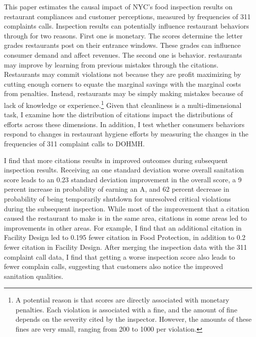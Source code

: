 \documentclass[10pt]{article} %
\begin{document}
This paper estimates the causal impact of NYC's food inspection results on restaurant compliances and customer perceptions, measured by frequencies of 311 complaints calls. Inspection results can potentially influence restaurant behaviors through for two reasons. First one is monetary. The scores determine the letter grades restaurants post on their entrance windows. These grades can influence consumer demand and affect revenues. The second one is behavior. restaurants may improve by learning from previous mistakes through the citations. Restaurants may commit violations not because they are profit maximizing by cutting enough corners to equate the marginal savings with the marginal costs from penalties. Instead, restaurants may be simply making mistakes because of lack of knowledge or experience.\footnote{A potential reason is that scores are directly associated with monetary penalties. Each violation is associated with a fine, and the amount of fine depends on the severity cited by the inspector. However, the amounts of these fines are very small, ranging from 200 to 1000 per violation.} Given that cleanliness is a multi-dimensional task, I examine how the distribution of citations impact the distributions of efforts across these dimensions. In addition, I test whether consumers behaviors respond to changes in restaurant hygiene efforts by measuring the changes in the frequencies of 311 complaint calls to DOHMH.

I find that more citations results in improved outcomes during subsequent inspection results. Receiving an one standard deviation worse overall sanitation score leads to an 0.23 standard deviation improvement in the overall score, a 9 percent increase in probability of earning an A, and 62 percent decrease in probability of being temporarily shutdown for unresolved critical violations during the subsequent inspection. While most of the improvement that a citation caused the restaurant to make is in the same area, citations in some areas led to improvements in other areas. For example, I find that an additional citation in Facility Design led to 0.195 fewer citation in Food Protection, in addition to 0.2 fewer citation in Facility Design. After merging the inspection data with the 311 complaint call data, I find that getting a worse inspection score also leads to fewer complain calls, suggesting that customers also notice the improved sanitation qualities.
\end{document}
